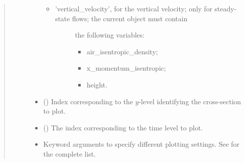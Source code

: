 \documentclass[letterpaper,10pt,english]{sphinxmanual}
\begin{document}
\begin{fulllineitems}
\begin{fulllineitems}
\begin{quote}
\begin{description}
\begin{itemize}
\begin{itemize}
\item {} \begin{description}
\item[{’vertical\_velocity’, for the vertical velocity; only for steady-state flows; the current object must contain}] \leavevmode
the following variables:
\begin{itemize}
\item {} 
air\_isentropic\_density;

\item {} 
x\_momentum\_isentropic;

\item {} 
height.

\end{itemize}

\end{description}

\end{itemize}


\item {} 
 () \textendash{} Index corresponding to the \(y\)-level identifying the cross-section to plot.

\item {} 
 () \textendash{} The index corresponding to the time level to plot.

\item {} 
 \textendash{} Keyword arguments to specify different plotting settings.
See {\hyperref[\detokenize{api:utils.utils_plot.contour_xz}]{}} for the complete list.

\end{itemize}

\end{description}\end{quote}

\end{fulllineitems}



\end{fulllineitems}
\end{document}
